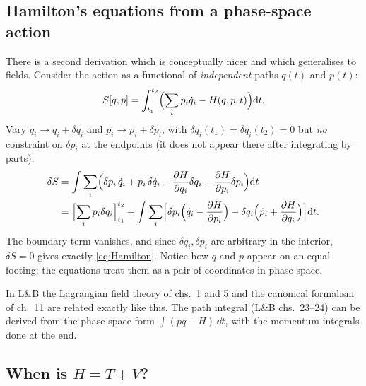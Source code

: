 \documentclass[11pt]{article}
\begin{document}
\subsection{Hamilton's equations from a phase-space action}

There is a second derivation which is conceptually nicer and which generalises to fields. Consider the action as a functional of \emph{independent} paths $q(t)$ and $p(t)$:
\begin{equation}
 S[q,p]=\int_{t_1}^{t_2}\Bigl(\sum_ip_i\dot q_i-H(q,p,t)\Bigr)\mathrm{d} t .
\end{equation}
Vary $q_i\to q_i+\delta q_i$ and $p_i\to p_i+\delta p_i$, with $\delta q_i(t_1)=\delta q_i(t_2)=0$ but \emph{no} constraint on $\delta p_i$ at the endpoints (it does not appear there after integrating by parts):
\begin{align}
 \delta S&=\int\sum_i\Bigl(\delta p_i\,\dot q_i+p_i\,\delta\dot q_i-\frac{\partial H}{\partial q_i}\delta q_i-\frac{\partial H}{\partial p_i}\delta p_i\Bigr)\mathrm{d} t\nonumber\\
 &=\Bigl[\sum_ip_i\delta q_i\Bigr]_{t_1}^{t_2}+\int\sum_i\Bigl[\delta p_i\Bigl(\dot q_i-\frac{\partial H}{\partial p_i}\Bigr)-\delta q_i\Bigl(\dot p_i+\frac{\partial H}{\partial q_i}\Bigr)\Bigr]\mathrm{d} t .
\end{align}
The boundary term vanishes, and since $\delta q_i,\delta p_i$ are arbitrary in the interior, $\delta S=0$ gives exactly \eqref{eq:Hamilton}. Notice how $q$ and $p$ appear on an equal footing: the equations treat them as a pair of coordinates in phase space.

\begin{qftbridge}
In L\&B the Lagrangian field theory of chs.~1 and 5 and the canonical formalism of ch.~11 are related exactly like this. The path integral (L\&B chs.~23--24) can be derived from the phase-space form $\int(p\dot q-H)\,\dd t$, with the momentum integrals done at the end.
\end{qftbridge}

\subsection{\texorpdfstring{When is $H=T+V$?}{When is H = T + V?}}
\end{document}
